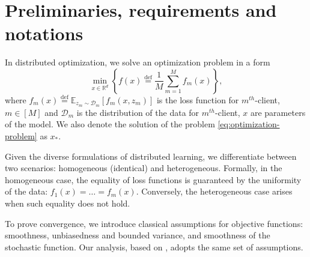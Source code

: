 \documentclass[sn-mathphys,Numbered]{sn-jnl}%
\newcommand*{\R}{{\mathbb R}}
\renewcommand{\|}{\parallel}
\newcommand\ec[2][]{\ensuremath{\mathbb{E}_{#1} \left[#2\right]}}
\newcommand\pbr[1]{\left \{ #1 \right \} }
\newcommand{\D}{\mathcal{D}}
\newcommand{\eqdef}{\overset{\text{def}}{=}}
\renewcommand {\*} {\ast}
\def\R{\mathbb{R}}
\begin{document}
\section{Preliminaries, requirements and notations}
In distributed optimization, we solve an optimization problem in a form 
\begin{equation}
     \label{eq:optimization-problem}
     \min_{x \in \R^d} \pbr{ f(x) \eqdef \frac{1}{M} \sum_{m=1}^{M} f_m (x)},
\end{equation}
where $f_m(x) \eqdef \ec[z_m \sim \D_m]{f_m(x, z_m)}$ is the loss function for $m^{th}$-client, $m \in [M]$ and $\D_m$ is the distribution of the data for $m^{th}$-client, $x$ are parameters of the model. We also denote the solution of the problem \eqref{eq:optimization-problem} as $x_\ast$.

Given the diverse formulations of distributed learning, we differentiate between two scenarios: homogeneous (identical) and heterogeneous. Formally, in the homogeneous case, the equality of loss functions is guaranteed by the uniformity of the data: $f_1(x) = \ldots = f_m(x)$. Conversely, the heterogeneous case arises when such equality does not hold.

To prove convergence, we introduce classical assumptions \cite{nesterov2003introductory, nemirovskij1983problem} for objective functions: smoothness, unbiasedness and bounded variance, and smoothness of the stochastic function. Our analysis, based on \cite{khaled2020tighter}, adopts the same set of assumptions.
 
\end{document}
